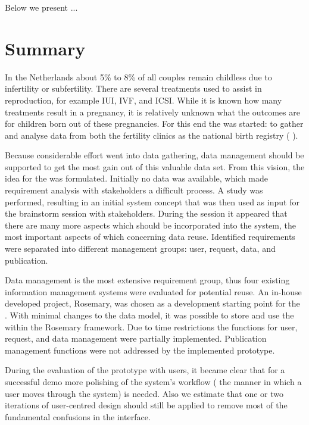 Below we present ...

\section{Summary}

In the Netherlands about 5\% to 8\% of all couples remain childless due to infertility or subfertility.
There are several treatments used to assist in reproduction, for example IUI, IVF, and ICSI.
While it is known how many treatments result in a pregnancy, it is relatively unknown what the outcomes are for children born out of these pregnancies.
For this end the \project{} was started: to gather and analyse data from both the fertility clinics as the national birth registry (\ie{} \PRN{}).

Because considerable effort went into data gathering, data management should be supported to get the most gain out of this valuable data set.
From this vision, the idea for the \ivfsystem{} was formulated.
Initially no data was available, which made requirement analysis with stakeholders a difficult process.
A study was performed, resulting in an initial system concept that was then used as input for the brainstorm session with stakeholders.
During the session it appeared that there are many more aspects which should be incorporated into the system, 
the most important aspects of which concerning data reuse.
Identified requirements were separated into different management groups: user, request, data, and publication.

Data management is the most extensive requirement group, thus four existing information management systems were evaluated for potential reuse.
An in-house developed project, Rosemary, was chosen as a development starting point for the \ivfsystem{}.
With minimal changes to the data model, it was possible to store and use the \projectdata{} within the Rosemary framework.
Due to time restrictions the functions for user, request, and data management were partially implemented.
Publication management functions were not addressed by the implemented prototype.

During the evaluation of the prototype with users, it became clear that for a successful demo more polishing of the system's workflow (\ie{} the manner in which a user moves through the system) is needed.
Also we estimate that one or two iterations of user-centred design should still be applied to remove most of the fundamental confusions in the interface.

